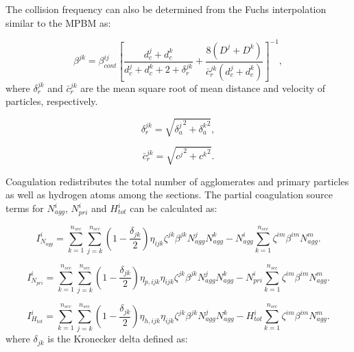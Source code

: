  The collision frequency can also be determined from the Fuchs interpolation similar to the MPBM as:

\begin{equation}
	\beta^{jk}=
	\beta^{ij}_{cont}
	\left[
		\frac{d^j_c+d^k_c}{d^j_c+d^k_c+2+\delta^{jk}_r}+
		\frac{8\left(D^j+D^k\right)}
		{\bar{c}^{jk}_r\left(d^j_c+d^k_c\right)}
	\right]^{-1},
	\label{eqn:betafuchssect}
\end{equation}
   \noindent where ${\delta^{jk}_r}$ and ${\bar{c}^{jk}_r}$ are the mean square root of mean distance and velocity of particles, respectively.

\begin{equation}
 	\delta^{jk}_r=
	\sqrt{
		{\delta^j_a}^2+{\delta^k_a}^2
	},
 	\label{eqn:sqrtmeandist}
\end{equation}

\begin{equation}
	\bar{c}^{jk}_r=
	\sqrt{
		{c^j}^2+{c^k}^2
	}
	\label{eqn:sqrtmeanvel}.
\end{equation}

Coagulation redistributes the total number of agglomerates and primary particles as well as hydrogen atoms among the sections. The partial coagulation source terms for ${N^i_{agg}}$, ${N^i_{pri}}$ and ${H^i_{tot}}$ can be calculated as:

\begin{equation}
	I^i_{N_{agg}}
	=
	\sum_{k=1}^{n_{sec}}\sum_{j=k}^{n_{sec}}
	\left(
		1-\frac{\delta_{jk}}{2}
	\right)
	\eta_{ijk}\zeta^{jk}\beta^{jk}N^j_{agg}N^k_{agg}
	-
	N^i_{agg}
	\sum_{k=1}^{n_{sec}}\zeta^{im}\beta^{im}N^m_{agg}
	\label{eqn:IcoagNaggsect}.
\end{equation}

\begin{equation}
	I^i_{N_{pri}}
	=
	\sum_{k=1}^{n_{sec}}\sum_{j=k}^{n_{sec}}
	\left(
	1-\frac{\delta_{jk}}{2}
	\right)
	\eta_{p,ijk}\eta_{ijk}\zeta^{jk}\beta^{jk}N^j_{agg}N^k_{agg}
	-
	N^i_{pri}
	\sum_{k=1}^{n_{sec}}\zeta^{im}\beta^{im}N^m_{agg}
	\label{eqn:IcoagNprisect}.
\end{equation}

\begin{equation}
	I^i_{H_{tot}}
	=
	\sum_{k=1}^{n_{sec}}\sum_{j=k}^{n_{sec}}
	\left(
	1-\frac{\delta_{jk}}{2}
	\right)
	\eta_{h,ijk}\eta_{ijk}\zeta^{jk}\beta^{jk}N^j_{agg}N^k_{agg}
	-
	H^i_{tot}
	\sum_{k=1}^{n_{sec}}\zeta^{im}\beta^{im}N^m_{agg}
	\label{eqn:IcoagHtotsect}.
\end{equation}
   \noindent where ${\delta_{jk}}$ is the Kronecker delta defined as:

